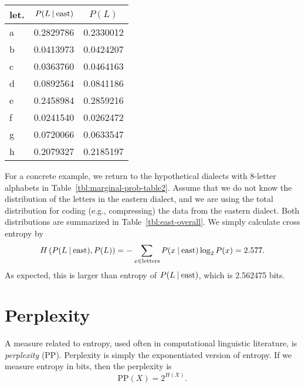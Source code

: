 \begin{margintable}
  \caption{\label{tbl:east-overall}%
    Probability distributions of letters in our hypothetical dialect data.
    $P(L\given{}D=\text{east})$ is the distribution of letters
    given the dialect is east dialect,
    $P(L)$ is the marginal distribution of letters (for all dialects).
  }
  \begin{center}
    \setlength{\tabcolsep}{4pt}
    \begin{tabular}{lS[round-precision=2]S[round-precision=2]}
      \toprule
      let. & {$P(L\given{}\text{east})$} & {$P(L)$} \\
      \midrule
      a & 0.2829786 & 0.2330012\\
      b & 0.0413973 & 0.0424207\\
      c & 0.0363760 & 0.0464163\\
      d & 0.0892564 & 0.0841186\\
      e & 0.2458984 & 0.2859216\\
      f & 0.0241540 & 0.0262472\\
      g & 0.0720066 & 0.0633547\\
      h & 0.2079327 & 0.2185197\\
      \bottomrule
    \end{tabular}
  \end{center}
\end{margintable}
For a concrete example,
we return to the hypothetical dialects with \num{8}-letter alphabets
in Table~\ref{tbl:marginal-prob-table2}.
Assume that we do not know the distribution of the letters
in the eastern dialect,
and we are using the total distribution
for coding (e.g., compressing) the data from the eastern dialect.
Both distributions are summarized in Table~\ref{tbl:east-overall}.
We simply calculate cross entropy by 
\[
  \begin{aligned}
    H\left(P(L\given{}\text{east}), P(L)\right) 
      = - \sum_{x\in \text{letters}} P(x\given{}\text{east}) \log_{2} P(x)
      = \num[round-precision=3]{2.577201} .
  \end{aligned}
\]
As expected,
this is larger than entropy of $P(L\given{}\text{east})$,
which is \num[round-precision=3]{2.562475} bits.

\section{Perplexity}

A measure related to entropy,
used often in computational linguistic literature,
is \emph{perplexity} (PP).
Perplexity is simply the exponentiated version of entropy.
If we measure entropy in bits, then the perplexity is
\begin{equation*}
  \text{PP}(X) = 2^{H(X)} .
\end{equation*}

